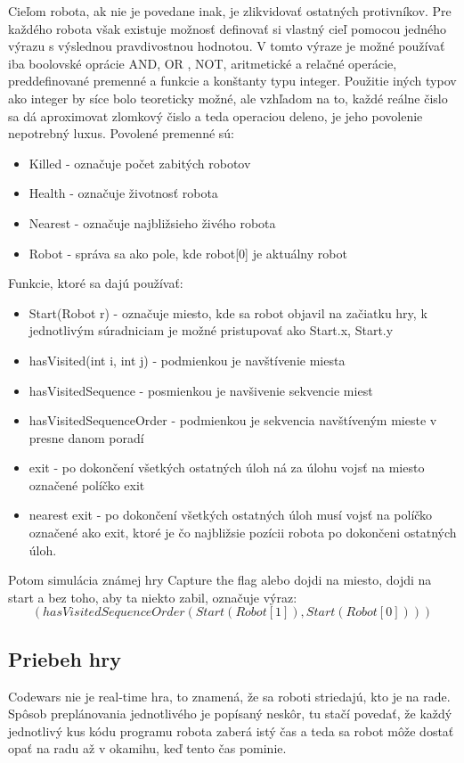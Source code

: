 Cieľom robota, ak nie je povedane inak, je zlikvidovať ostatných protivníkov. Pre každého robota však existuje možnosť definovať si vlastný cieľ pomocou jedného výrazu s výslednou pravdivostnou hodnotou. V tomto výraze je možné používať iba boolovské oprácie AND, OR , NOT, aritmetické  a relačné operácie, preddefinované  premenné a funkcie a konštanty typu integer. Použitie iných typov ako integer by síce bolo teoreticky možné, ale vzhľadom na to, každé reálne čislo sa dá aproximovat zlomkový čislo a teda operaciou deleno, je jeho povolenie nepotrebný luxus. Povolené premenné sú:
\begin{itemize}
\item Killed - označuje počet zabitých robotov
\item Health - označuje životnosť robota
\item Nearest - označuje najbližsieho živého robota
\item Robot - správa sa ako pole, kde robot[0] je aktuálny robot
\end{itemize}
Funkcie, ktoré sa dajú používať:\\
\begin{itemize}
\item Start(Robot r) - označuje miesto, kde sa robot objavil na začiatku hry, k jednotlivým súradniciam je možné pristupovať ako Start.x, Start.y
\item hasVisited(int i, int j) - podmienkou je navštívenie miesta
\item hasVisitedSequence - posmienkou je navšivenie sekvencie miest
\item hasVisitedSequenceOrder - podmienkou je sekvencia navštíveným mieste v presne danom poradí
\item exit - po dokončení všetkých ostatných úloh ná za úlohu vojsť na miesto označené políčko exit
\item nearest exit - po dokončení všetkých ostatných úloh musí vojsť na políčko označené ako exit, ktoré je čo najbližsie pozícii robota po dokončeni ostatných úloh.
\end{itemize}
Potom simulácia známej hry Capture the flag alebo dojdi na miesto, dojdi na start a bez toho, aby ta niekto zabil, označuje výraz:\\
$$ (hasVisitedSequenceOrder(Start(Robot[1]), Start(Robot[0])))$$
\subsection {Priebeh hry}
Codewars nie je real-time hra, to znamená, že sa roboti striedajú, kto je na rade. Spôsob preplánovania jednotlivého je popísaný neskôr, tu stačí povedať, že každý jednotlivý kus kódu programu robota zaberá istý čas a teda sa robot môže dostať opať na radu až v okamihu, keď tento čas pominie.
